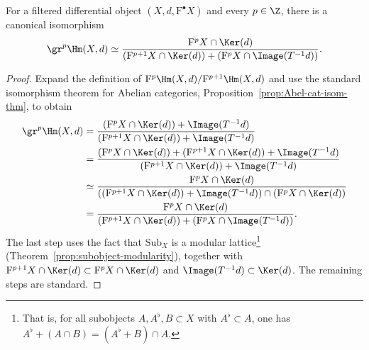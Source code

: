 \begin{lemma}\label{prop:induced-filtration-gr}
	For a filtered differential object $(X,d,\mathrm{F}^\bullet X)$ and every
	$p\in\Z$, there is a canonical isomorphism
	\[ \gr^p\Hm(X,d)\simeq
	\dfrac{\mathrm{F}^pX\cap\Ker(d)}
	{(\mathrm{F}^{p+1}X\cap\Ker(d))
	 +(\mathrm{F}^pX\cap\Image(T^{-1}d))}. \]
\end{lemma}
\begin{proof}
	Expand the definition of
	$\mathrm{F}^p\Hm(X,d)/\mathrm{F}^{p+1}\Hm(X,d)$ and use the standard
	isomorphism theorem for Abelian categories,
	Proposition~\ref{prop:Abel-cat-isom-thm}, to obtain
	\begin{align*}
		\gr^p\Hm(X,d)
		&=\dfrac{(\mathrm{F}^pX\cap\Ker(d))+\Image(T^{-1}d)}
		{(\mathrm{F}^{p+1}X\cap\Ker(d))+\Image(T^{-1}d)} \\
		&=\dfrac{(\mathrm{F}^pX\cap\Ker(d))
		 +(\mathrm{F}^{p+1}X\cap\Ker(d))+\Image(T^{-1}d)}
		{(\mathrm{F}^{p+1}X\cap\Ker(d))+\Image(T^{-1}d)} \\
		&\simeq\dfrac{\mathrm{F}^pX\cap\Ker(d)}
		{((\mathrm{F}^{p+1}X\cap\Ker(d))+\Image(T^{-1}d))
		 \cap(\mathrm{F}^pX\cap\Ker(d))} \\
		&=\dfrac{\mathrm{F}^pX\cap\Ker(d)}
		{(\mathrm{F}^{p+1}X\cap\Ker(d))
		 +(\mathrm{F}^pX\cap\Image(T^{-1}d))}.
	\end{align*}
	The last step uses the fact that $\mathrm{Sub}_X$ is a modular
	lattice\footnote{That is, for all subobjects $A,A^\flat,B\subset X$ with
	$A^\flat\subset A$, one has
	$A^\flat+(A\cap B)=(A^\flat+B)\cap A$.}
	(Theorem~\ref{prop:subobject-modularity}), together with
	$\mathrm{F}^{p+1}X\cap\Ker(d)\subset\mathrm{F}^pX\cap\Ker(d)$ and
	$\Image(T^{-1}d)\subset\Ker(d)$. The remaining steps are standard.
\end{proof}

